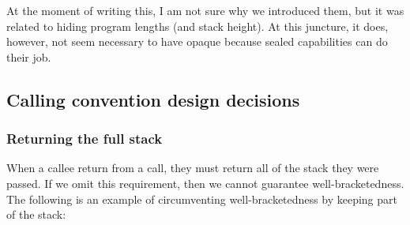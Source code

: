 \documentclass[a3paper]{article}
\begin{document}
At the moment of writing this, I am not sure why we introduced them, but it was related to hiding program lengths (and stack height).
At this juncture, it does, however, not seem necessary to have opaque because sealed capabilities can do their job.

\subsection{Calling convention design decisions}
\subsubsection{Returning the full stack}
When a callee return from a call, they must return all of the stack they were passed. If we omit this requirement, then we cannot guarantee well-bracketedness. The following is an example of circumventing well-bracketedness by keeping part of the stack:
\end{document}
